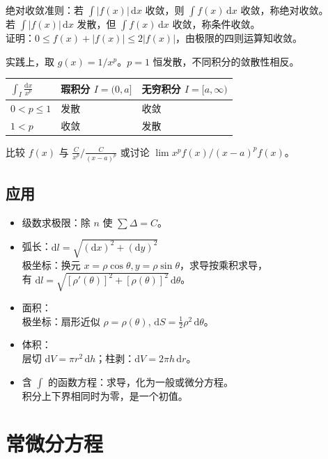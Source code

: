 \documentclass[12pt, a4paper, UTF8, openany]{ctexbook}
\newcommand{\dif}{\mathrm{d}}
\newcommand{\difx}{\,\mathrm{d}x}
\begin{document}
        绝对收敛准则：若 $\int |f(x)|\difx$ 收敛，则 $\int f(x)\difx$ 收敛，称绝对收敛。\\
        若 $\int |f(x)|\difx$ 发散，但 $\int f(x)\difx$ 收敛，称条件收敛。\\
        证明：$0 \leqslant f(x) + |f(x)| \leqslant 2|f(x)|$，由极限的四则运算知收敛。

        实践上，取 $g(x) = 1 / x^p$。$p = 1$ 恒发散，不同积分的敛散性相反。
        \begin{longtable}[h]{w{c}{2cm}*{2}{|w{c}{6cm}}}
            $\int_I \frac{\dif x}{x^p}$ & 瑕积分 $I = (0, a]$ & 无穷积分 $I = [a, \infty)$ \\
            \midrule
            $0 < p \leqslant 1$         & 发散                & 收敛 \\
            \midrule
            $1 < p$                     & 收敛                & 发散 
        \end{longtable}

        比较 $f(x)$ 与 $\frac{C}{x^p} / \frac{C}{(x - a)^p}$ 或讨论 $\lim x^pf(x) / (x - a)^pf(x)$。
        
    \section{应用}
    \begin{itemize}
        \item 级数求极限：除 $n$ 使 $\sum \Delta = C$。
        \item 弧长：$\dif l = \sqrt{(\dif x)^2 + (\dif y)^2}$\\
            极坐标：换元 $x = \rho\cos\theta, y = \rho\sin\theta$，求导按乘积求导，\\
                有 $\dif l = \sqrt{[\rho'(\theta)]^2 + [\rho(\theta)]^2}\,\dif\theta$。
        \item 面积：\\
            极坐标：扇形近似 $\rho = \rho(\theta), \, \dif S = \frac{1}{2} \rho^2 \,\dif\theta$。
        \item 体积：\\
            层切 $\dif V = \pi r^2 \,\dif h$；柱剥：$\dif V = 2\pi h \,\dif r$。
        \item 含 $\int$ 的函数方程：求导，化为一般或微分方程。\\
            {\heiti 积分上下界相同}时为零，是一个{\heiti 初值}。
    \end{itemize}

    \chapter{常微分方程}
\end{document}
